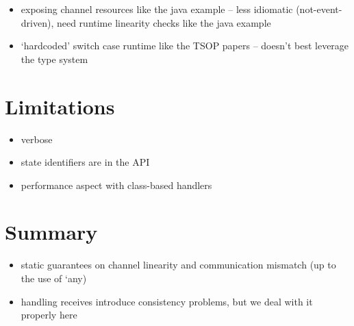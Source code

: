 \begin{itemize}
\item exposing channel resources like the java example -- less idiomatic (not-event-driven), need runtime linearity checks like the java example
\item `hardcoded' switch case runtime like the TSOP papers -- doesn't best leverage the type system
\end{itemize}

\section{Limitations}
\label{section:nodelimitations}

\begin{itemize}
\item verbose
\item state identifiers are in the API
\item performance aspect with class-based handlers
\end{itemize}


\section{Summary}
\begin{itemize}
\item static guarantees on channel linearity and communication mismatch (up to the use of `any)
\item handling receives introduce consistency problems, but we deal with it properly here
\end{itemize}